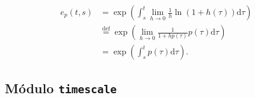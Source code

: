 \begin{frame}
	\begin{align*}
	e_{p}\left(t,s\right)
	&=\exp\left(\int_{s}^{t}\lim\limits_{h\to0}\frac{1}{h}\ln\left(1+h\left(\tau\right)\right)\mathrm{d}\tau\right)\\
	&\stackrel{\operatorname{def}}{=}\exp\left(\lim\limits_{h\to0}\frac{1}{1+hp\left(\tau\right)}p\left(\tau\right)\mathrm{d}\tau\right)\\
	&=\exp\left(\int_{s}^{t}p\left(\tau\right)\mathrm{d}\tau\right).
	\end{align*}
\end{frame}

\subsection{Módulo \texttt{timescale}}

{
	\begin{frame}[plain]
	\end{frame}
}